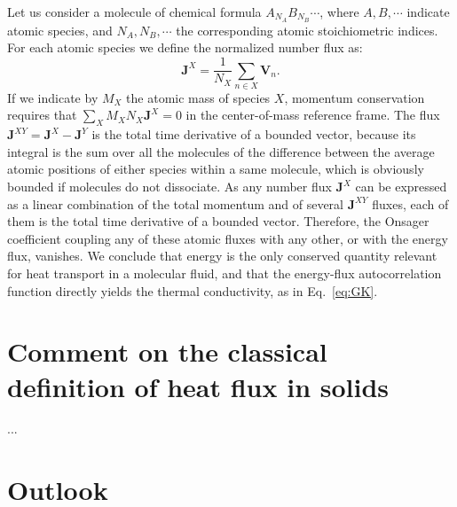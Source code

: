 Let us consider a molecule of chemical formula $A_{N_A} B_{N_B}\cdots$, where $A, B,\cdots$ indicate atomic species, and $N_A,N_B,\cdots$ the corresponding atomic stoichiometric indices. For each atomic species we define the normalized number flux as:
\begin{equation}
  \mathbf{J}^X = \frac{1}{N_X}\sum_{n\in X} \mathbf{V}_n. \label{eq:JX}
\end{equation}
If we indicate by $M_X$ the atomic mass of species $X$, momentum conservation requires that $\sum_X M_X N_X \mathbf{J}^X = 0$ in the center-of-mass reference frame. The flux $\mathbf{J}^{XY} = \mathbf{J}^{X}-\mathbf{J}^{Y}$ is the total time derivative of a bounded vector, because its integral is the sum over all the molecules of the difference between the average atomic positions of either species within a same molecule, which is obviously bounded if molecules do not dissociate. As any number flux $\mathbf{J}^X$ can be expressed as a linear combination of the total momentum and of several $\mathbf{J}^{XY}$ fluxes, each of them is the total time derivative of a bounded vector. Therefore, the Onsager coefficient coupling any of these atomic fluxes with any other, or with the energy flux, vanishes. We conclude that energy is the only conserved quantity relevant for heat transport in a molecular fluid, and that the energy-flux autocorrelation function directly yields the thermal conductivity, as in Eq.~\eqref{eq:GK}.


\section{Comment on the classical definition of heat flux in solids}  \label{sec:carbogno}

...

\section{Outlook}  \label{sec:gauge-outlook}

